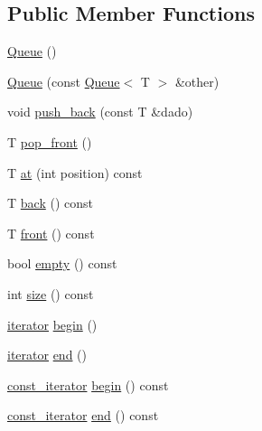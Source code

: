\subsection*{Public Member Functions}
\begin{DoxyCompactItemize}
\item 
\hyperlink{classQueue_af73bb29c868f7b37f369c668f114bd9f}{Queue} ()
\item 
\hyperlink{classQueue_ac3b3b360bf22dd4ef5874449880ece63}{Queue} (const \hyperlink{classQueue}{Queue}$<$ T $>$ \&other)
\item 
void \hyperlink{classQueue_ad683a72dcd5d34a7aa0b906aed09d32f}{push\-\_\-back} (const T \&dado)
\item 
T \hyperlink{classQueue_a21992fd19ab9b53682b03059ecd04c61}{pop\-\_\-front} ()
\item 
T \hyperlink{classQueue_a91492afa6103be0ffdfcc886fc996b25}{at} (int position) const 
\item 
T \hyperlink{classQueue_ae9af6d3cfe017a2f1bf1fd35ce9e99c3}{back} () const 
\item 
T \hyperlink{classQueue_a057aac4f78168ea144118dac4222d192}{front} () const 
\item 
bool \hyperlink{classQueue_a74e1442a08f38177e7dd7f7c8af22d30}{empty} () const 
\item 
int \hyperlink{classQueue_ad13b6467a10f5b6b8b78716787a77fd4}{size} () const 
\item 
\hyperlink{classQueue_abc9e9289124dc3ae5377a7e3d3fbe928}{iterator} \hyperlink{classQueue_a0f8479ac20e00d122558dce6c3c71473}{begin} ()
\item 
\hyperlink{classQueue_abc9e9289124dc3ae5377a7e3d3fbe928}{iterator} \hyperlink{classQueue_aae0dd33cf275e880bc244aeba0f2fc25}{end} ()
\item 
\hyperlink{classQueue_a10a22f024abb831966e98b859bb2e64d}{const\-\_\-iterator} \hyperlink{classQueue_a652c1526d0a99cc153bec8df86105cca}{begin} () const 
\item 
\hyperlink{classQueue_a10a22f024abb831966e98b859bb2e64d}{const\-\_\-iterator} \hyperlink{classQueue_abdd805a2bb752ed37ab2dbc1493a9e24}{end} () const 
\end{DoxyCompactItemize}


